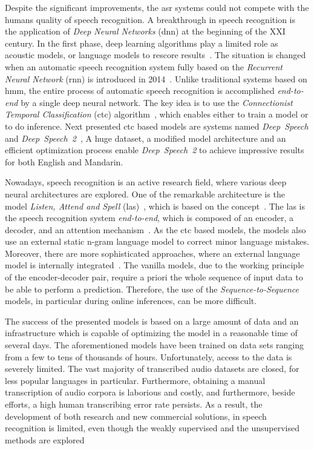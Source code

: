 Despite the significant improvements, the \acrshort{asr} systems could not compete with the humans quality
of speech recognition.
A breakthrough in speech recognition is the application of \textit{Deep Neural Networks} (\acrshort{dnn})
at the beginning of the XXI century.
In the first phase, deep learning algorithms play a limited role as acoustic models,
or language models to rescore results~\cite{bourlard1993,renals1994,ellis1999}.
The situation is changed when an automatic speech recognition system fully based on
the \textit{Recurrent Neural Network} (\acrshort{rnn}) is introduced in 2014~\cite{graves2014}.
Unlike traditional systems based on \acrshort{hmm}, the entire process of automatic speech recognition is
accomplished \textit{end-to-end} by a single deep neural network.
The key idea is to use the \textit{Connectionist Temporal Classification} (\acrshort{ctc}) algorithm~\cite{graves2006},
which enables either to train a model or to do inference.
Next presented \acrshort{ctc} based models are systems named \textit{Deep~Speech} and \textit{Deep~Speech~2}~\cite{hannun2014,amodei2015},
A huge dataset, a modified model architecture and an efficient optimization process enable \textit{Deep~Speech~2}
to achieve impressive results for both English and Mandarin.

Nowadays, speech recognition is an active research field, where various
deep neural architectures are explored.
One of the remarkable architecture is the model \textit{Listen, Attend and Spell} (\acrshort{las})~\cite{chan2015}, which
is based on the  concept~\cite{cho2014}.
The \acrshort{las} is the speech recognition system \textit{end-to-end}, which
is composed of an encoder, a decoder, and an attention mechanism~\cite{bahdanau2014,chan2015}.
As the \acrshort{ctc} based models, the  models also use an external
static n-gram language model to correct minor language mistakes.
Moreover, there are more sophisticated approaches, where an external language model is internally integrated~\cite{gulcehre2015,chorowski2016,sriram2018}.
The vanilla  models, due to the working principle of the encoder-decoder pair,
require a priori the whole sequence of input data to be able to perform a prediction.
Therefore, the use of the \textit{Sequence-to-Sequence} models, in particular during online inferences,
can be more difficult.

The success of the presented models is based on a large amount of data and an infrastructure
which is capable of optimizing the model in a reasonable time of several days.
The aforementioned models have been trained on data sets ranging from a few to tens of thousands of hours.
Unfortunately, access to the data is severely limited.
The vast majority of transcribed audio datasets are closed, for less popular languages in particular.
Furthermore, obtaining a manual transcription of audio corpora is laborious and costly, and furthermore,
beside efforts, a high human transcribing error rate persists.
As a result, the development of both research and new commercial solutions,
in speech recognition is limited, even though the weakly supervised and the unsupervised methods
are explored~\cite{chaabouni2017,chung2018,el-geish2019}

